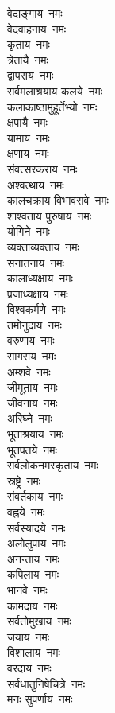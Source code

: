 \begin{multicols}{2}
\begin{flushleft}
वेदाङ्गाय~नमः\\
वेदवाहनाय~नमः\\
कृताय~नमः\\
त्रेतायै~नमः\\
द्वापराय~नमः\\
सर्वमलाश्रयाय कलये~नमः\\
कलाकाष्ठामुहूर्तेभ्यो~नमः\hfill{}\\
क्षपायै~नमः\\
यामाय~नमः\\
क्षणाय~नमः\\
संवत्सरकराय~नमः\\
अश्वत्थाय~नमः\\
कालचक्राय विभावसवे~नमः\\
शाश्वताय पुरुषाय~नमः\\
योगिने~नमः\\
व्यक्ताव्यक्ताय~नमः\\
सनातनाय~नमः\hfill{}\\
कालाध्यक्षाय~नमः\\
प्रजाध्यक्षाय~नमः\\
विश्वकर्मणे~नमः\\
तमोनुदाय~नमः\\
वरुणाय~नमः\\
सागराय~नमः\\
अम्शवे~नमः\\
जीमूताय~नमः\\
जीवनाय~नमः\\
अरिघ्ने~नमः\hfill{}\\
भूताश्रयाय~नमः\\
भूतपतये~नमः\\
सर्वलोकनमस्कृताय~नमः\\
स्रष्ट्रे~नमः\\
संवर्तकाय~नमः\\
वह्नये~नमः\\
सर्वस्यादये~नमः\\
अलोलुपाय~नमः\\
अनन्ताय~नमः\\
कपिलाय~नमः\hfill{}\\
भानवे~नमः\\
कामदाय~नमः\\
सर्वतोमुखाय~नमः\\
जयाय~नमः\\
विशालाय~नमः\\
वरदाय~नमः\\
सर्वधातुनिषेचित्रे~नमः\\
मनः सुपर्णाय~नमः\\

\end{flushleft}
\end{multicols}
